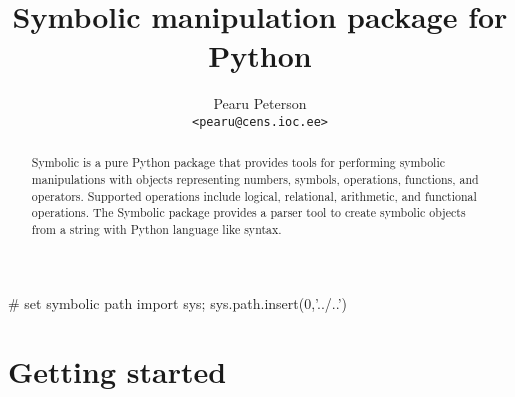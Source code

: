 \documentclass[a4paper,12pt]{article}
\title{Symbolic manipulation package for Python}
\author{Pearu Peterson\\\texttt{\normalsize<pearu@cens.ioc.ee>}}
\begin{document}
\maketitle

\begin{abstract}
  Symbolic is a pure Python package that provides tools for performing
  symbolic manipulations with objects representing numbers, symbols,
  operations, functions, and operators. Supported operations include
  logical, relational, arithmetic, and functional operations. The
  Symbolic package provides a parser tool to create symbolic objects
  from a string with Python language like syntax.
\end{abstract}

\begin{python*}
# set symbolic path
import sys; sys.path.insert(0,'../..')
\end{python*}

\section{Getting started}
\end{document}
